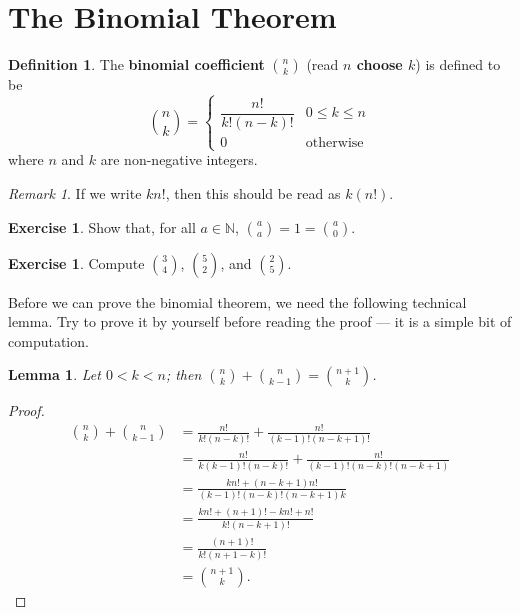 \documentclass[a4paper, 10pt]{amsart}
\newtheorem{lem}[thm]{Lemma}
\theoremstyle{definition}
\newtheorem{defn}[thm]{Definition}
\newtheorem{exercise}[thm]{Exercise}
\theoremstyle{remark}
\newtheorem{rem}[thm]{Remark}
\begin{document}
\section{The Binomial Theorem}
\begin{defn}
  The \textbf{binomial coefficient} $ \binom{n}{k} $ (read \textbf{$ n $ choose $ k $}) is defined to be
  \begin{displaymath}
    \binom{n}{k} = \begin{cases}
                     \dfrac{n!}{k!(n - k)!} & 0 \leq k \leq n\\
                     0 & \text{otherwise}
                   \end{cases}
  \end{displaymath}
  where $ n $ and $ k $ are non-negative integers.
\end{defn}

\begin{rem}
  If we write $ kn! $, then this should be read as $ k(n!) $.
\end{rem}

\begin{exercise}
  Show that, for all $ a \in \mathbb{N} $, $ \binom{a}{a} = 1 = \binom{a}{0} $.
\end{exercise}

\begin{exercise}
  Compute $ \binom{3}{4} $, $ \binom{5}{2} $, and $ \binom{2}{5} $.
\end{exercise}

Before we can prove the binomial theorem, we need the following technical lemma. Try to prove it
by yourself before reading the proof --- it is a simple bit of computation.
\begin{lem}
  Let $ 0 < k < n $; then $ \binom{n}{k} + \binom{n}{k - 1} = \binom{n + 1}{k} $.
\end{lem}
\begin{proof}
  \begin{align*}
    \binom{n}{k} + \binom{n}{k - 1} &= \frac{n!}{k! (n - k)!} + \frac{n!}{(k - 1)! (n - k + 1)!}\\
                                    &= \frac{n!}{k(k - 1)! (n - k)!} + \frac{n!}{(k - 1)! (n - k)! (n - k + 1)}\\
                                    &= \frac{kn! + (n - k + 1) n!}{(k - 1)! (n - k)! (n - k + 1)k}\\
                                    &= \frac{kn! + (n + 1)! - kn! + n!}{k!(n - k + 1)!}\\
                                    &= \frac{(n + 1)!}{k!(n + 1 - k)!}\\
                                    &= \binom{n + 1}{k}.
  \end{align*}
\end{proof}
\end{document}
